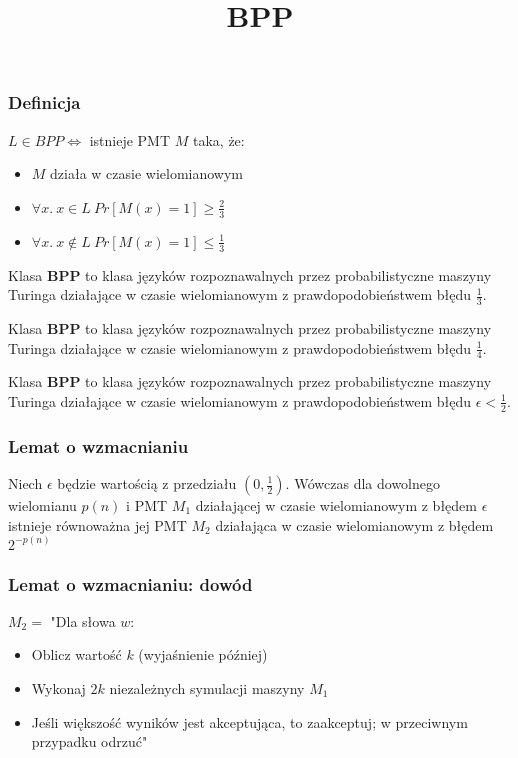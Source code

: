 \documentclass[compress]{beamer}
\title{BPP}
\begin{document}
\begin{frame}
\titlepage
\end{frame}

\begin{frame}
\frametitle{Definicja}
\justifying
\(L \in BPP \Leftrightarrow \) istnieje PMT \(M\) taka, że:
\begin{itemize}
	\item \(M\) działa w czasie wielomianowym
	\item \(\forall x. ~ x \in L ~ Pr[M(x) = 1] \geq \frac{2}{3} \)
	\item \(\forall x. ~ x \notin L ~ Pr[M(x) = 1] \leq \frac{1}{3} \)
\end{itemize}
\end{frame}

\begin{frame}
\justifying
Klasa \textbf{BPP} to klasa języków rozpoznawalnych przez probabilistyczne maszyny Turinga działające w czasie wielomianowym z prawdopodobieństwem błędu \(\frac{1}{3}\).
\end{frame}

\begin{frame}
\justifying
Klasa \textbf{BPP} to klasa języków rozpoznawalnych przez probabilistyczne maszyny Turinga działające w czasie wielomianowym z prawdopodobieństwem błędu \(\frac{1}{4}\).
\end{frame}

\begin{frame}
\justifying
Klasa \textbf{BPP} to klasa języków rozpoznawalnych przez probabilistyczne maszyny Turinga działające w czasie wielomianowym z prawdopodobieństwem błędu \(\epsilon < \frac{1}{2} \).
\end{frame}

\begin{frame}
\frametitle{Lemat o wzmacnianiu}
\justifying
Niech \(\epsilon\) będzie wartością z przedziału \((0, \frac{1}{2})\). Wówczas dla dowolnego wielomianu \(p(n)\) i PMT \(M_1\) działającej w czasie wielomianowym z błędem \(\epsilon\) istnieje równoważna jej PMT \(M_2\) działająca w czasie wielomianowym z błędem \(2^{-p(n)}\)
\end{frame}

\begin{frame}
	\frametitle{Lemat o wzmacnianiu: dowód}
	\(M_2=\) "Dla słowa \(w\):
	\begin{itemize}
		\item Oblicz wartość \(k\) (wyjaśnienie później)
		\item Wykonaj \(2k\) niezależnych symulacji maszyny \(M_1\)
		\item Jeśli większość wyników jest akceptująca, to zaakceptuj; w przeciwnym przypadku odrzuć"
	\end{itemize}
\end{frame}
\end{document}
